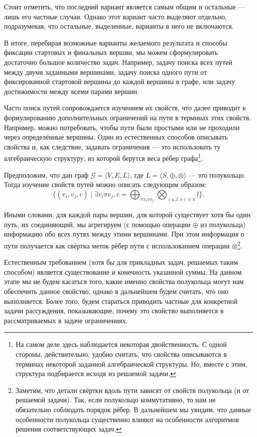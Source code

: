 Стоит отметить, что последний вариант является самым общим и остальные --- лишь его частные случаи. 
Однако этот вариант часто выделяют отдельно, подразумевая, что остальные, выделенные, варианты в него не включаются.

В итоге, перебирая возможные варианты желаемого результата и способы фиксации стартовых и финальных вершин, мы можем сформулировать достаточно большое количество задач. Например, задачу поиска всех путей между двумя заданными вершинами, задачу поиска одного пути от фиксированной стартовой вершины до каждой вершины в графе, или задачу достижимости между всеми парами вершин.

Часто поиск путей сопровождается изучением их свойств, что далее приводит к формулированию дополнительных ограничений на пути в терминах этих свойств. Например, можно потребовать, чтобы пути были простыми или не проходили через определённые вершины. Один из естественных способов описывать свойства и, как следствие, задавать ограничения --- это использовать ту алгебраическую структуру, из которой берутся веса рёбер графа\footnote{На самом деле здесь наблюдается некоторая двойственность. С одной стороны, действительно, удобно считать, что свойства описываются в терминах некоторой заданной алгебраической структуры. Но, вместе с этим, структура подбирается исходя из решаемой задачи.}. 

Предположим, что дан граф $\mathcal{G} = \langle V, E, L\rangle $, где $L = \langle S, \oplus, \otimes \rangle$ --- это полукольцо. Тогда изучение свойств путей можно описать следующим образом: $$ \{(v_i, v_j, c) \mid \exists v_i \pi v_j, c = \bigoplus_{\forall v_i \pi v_j} \bigotimes_{(u,l,v) \in \pi } l \}.$$

Иными словами, для каждой пары вершин, для которой существует хотя бы один путь, их соединяющий, мы агрегируем (с помощью операции $\oplus$ из полукольца) информацию обо всех путях между этими вершинами. При этом информация о пути получается как свёртка меток рёбер пути с использованием операции $\otimes$\footnote{Заметим, что детали свёртки вдоль пути зависят от свойств полукольца (и от решаемой задачи). Так, если полукольцо коммутативно, то нам не обязательно соблюдать порядок рёбер. В дальнейшем мы увидим, что данные особенности полукольца существенно влияют на особенности алгоритмов решения соответствующих задач.}.

Естественным требованием (хотя бы для прикладных задач, решаемых таким способом) является существование и конечность указанной суммы. На данном этапе мы не будем касаться того, какие именно свойства полукольца могут нам обеспечить данное свойство, однако в дальнейшем будем считать, что оно выполняется. Более того, будем стараться приводить частные для конкретной задачи рассуждения, показывающие, почему это свойство выполняется в рассматриваемых в задаче ограничениях.

